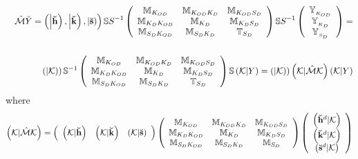 \begin{eqnarray}
&&{\cal \hat{M}}\breve{Y}=\left( \left| {\bf \breve{h}}\right) ,\left| {\bf 
\breve{k}}\right) ,\left| {\bf \breve{s}}\right) \right) {\Bbb SS}%
^{-1}\left( 
\begin{array}{ccc}
{\Bbb M}_{K_{OD}} & {\Bbb M}_{K_{OD}K_{D}} & {\Bbb M}_{K_{OD}S_{D}} \\ 
{\Bbb M}_{K_{D}K_{OD}} & {\Bbb M}_{K_{D}} & {\Bbb M}_{K_{D}S_{D}} \\ 
{\Bbb M}_{S_{D}K_{OD}} & {\Bbb M}_{S_{D}K_{D}} & {\Bbb T}_{S_{D}}%
\end{array}%
\right) {\Bbb SS}^{-1}\left( 
\begin{array}{c}
{\Bbb Y}_{_{K_{OD}}} \\ 
{\Bbb Y}_{_{K_{D}}} \\ 
{\Bbb Y}_{_{S_{D}}}%
\end{array}%
\right) = \\
&&  \nonumber \\
&&\left( \left| {\cal K}\right) \right) {\Bbb S}^{-1}\left( 
\begin{array}{ccc}
{\Bbb M}_{K_{OD}} & {\Bbb M}_{K_{OD}K_{D}} & {\Bbb M}_{K_{OD}S_{D}} \\ 
{\Bbb M}_{K_{D}K_{OD}} & {\Bbb M}_{K_{D}} & {\Bbb M}_{K_{D}S_{D}} \\ 
{\Bbb M}_{S_{D}K_{OD}} & {\Bbb M}_{S_{D}K_{D}} & {\Bbb T}_{S_{D}}%
\end{array}%
\right) {\Bbb S}\left( {\cal K}|Y\right) =\left( \left| {\cal K}\right)
\right) \left( {\cal K}|{\cal \hat{M}K}\right) \left( {\cal K}|Y\right)
\end{eqnarray}%
where 
\begin{equation}
\left( {\cal K}|{\cal \hat{M}K}\right) =\left( 
\begin{array}{ccc}
\left( {\cal K}|{\bf \breve{h}}\right) & \left( {\cal K}|{\bf \breve{k}}%
\right) & \left( {\cal K}|{\bf \breve{s}}\right)%
\end{array}%
\right) \left( 
\begin{array}{ccc}
{\Bbb M}_{K_{OD}} & {\Bbb M}_{K_{OD}K_{D}} & {\Bbb M}_{K_{OD}S_{D}} \\ 
{\Bbb M}_{K_{D}K_{OD}} & {\Bbb M}_{K_{D}} & {\Bbb M}_{K_{D}S_{D}} \\ 
{\Bbb M}_{S_{D}K_{OD}} & {\Bbb M}_{S_{D}K_{D}} & {\Bbb M}_{S_{D}}%
\end{array}%
\right) \left( 
\begin{array}{c}
\left( {\bf \breve{h}}^{d}|{\cal K}\right) \\ 
\left( {\bf \breve{k}}^{d}|{\cal K}\right) \\ 
\left( {\bf \breve{s}}^{d}|{\cal K}\right)%
\end{array}%
\right)
\end{equation}%

